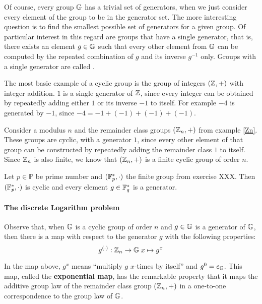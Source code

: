 Of course, every group $\mathbb{G}$ has a trivial set of generators, when we just consider every element of the group to be in the generator set. The more interesting question is to find the smallest possible set of generators for a given group. Of particular interest in this regard are groups that have a single generator, that is, there exists an element $g\in\mathbb{G}$ such that every other element from $\mathbb{G}$ can be computed by the repeated combination of $g$ and its inverse $g^{-1}$ only. Groups with a single generator are called .\label{cyclic-groups}
\begin{example} The most basic example of a cyclic group is the group of integers $(\mathbb{Z},+)$ with integer addition. $1$ is a single generator of $\mathbb{Z}$, since every integer can be obtained by repeatedly adding either $1$ or its inverse $-1$ to itself. For example
$-4$ is generated by $-1$, since $-4=-1+(-1)+(-1)+(-1)$.
\end{example}
\begin{example} Consider a modulus $n$ and the remainder class groups $(\mathbb{Z}_n,+)$ from example \ref{Zn}. These groups are cyclic, with a generator $1$, since every other element of that group can be constructed by repeatedly adding the remainder class $1$ to itself. Since $\mathbb{Z}_n$ is also finite, we know that $(\mathbb{Z}_n,+)$ is a finite cyclic group of order $n$.
\end{example}
\begin{example}\label{ex:modulus-prime-group} Let $p\in\mathbb{P}$ be prime number and $(\mathbb{F}_p^*,\cdot)$ the finite group from exercise XXX. Then $(\mathbb{F}_p^*,\cdot)$ is cyclic and every element $g\in\mathbb{F}_q^*$ is a generator.
\end{example}
\paragraph{The discrete Logarithm problem}
Observe that, when
$\mathbb{G}$ is a cyclic group of order $n$ and $g\in \mathbb{G}$ is a generator of $\mathbb{G}$, then there is a map with respect to the generator $g$ with the following properties:
\begin{equation}\label{exponentialmap}
g^{(\cdot)}: \mathbb{Z}_n \to \mathbb{G}\; x \mapsto g^x
\end{equation}

In the map above,  $g^x$ means ``multiply $g$ $x$-times by itself'' and $g^0=e_{\mathbb{G}}$. This map, called the \textbf{exponential map}, has the remarkable property that it maps the additive group law of the remainder class group $(\mathbb{Z}_n,+)$ in a one-to-one correspondence to the group law of $\mathbb{G}$.

